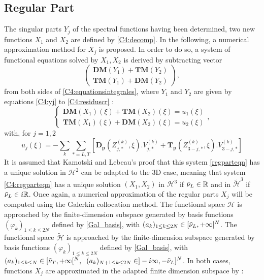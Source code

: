 \subsection{Regular Part}
\label{C4:regpart}
The singular parts $Y_j$ of the spectral functions having been determined, two new functions $X_1$ and $X_2$ are defined by \eqref{C4:decomp}. In the following, a numerical approximation method for $X_j$ is proposed. In order to do so, a system of functional equations solved by $X_1, X_2$ is derived by subtracting vector 
\begin{equation}
\begin{pmatrix}
\textbf{DM}(Y_1)+\textbf{TM}(Y_2) \\
\textbf{TM}(Y_1)+\textbf{DM}(Y_2)
\end{pmatrix},
\end{equation}
from both sides of \eqref{C4:equationsintegrales}, where $Y_1$ and $Y_2$ are given by equations \eqref{C4:yj} to \eqref{C4:residuscr} :
\begin{equation}
\left\{ 
\begin{matrix}
\mathbf{DM}(X_1)(\xi)+\textbf{TM}(X_2)(\xi)=u_1(\xi)\\
\textbf{TM}(X_1)(\xi)+\textbf{DM}(X_2)(\xi)=u_2(\xi)
\end{matrix}
\right.,
\label{C4:regparteqn}
\end{equation}
with, for $j=1,2$
\begin{equation}
u_j(\xi)=-\sum_k \sum_{*=L,T} \left[ \mathbf{D_p}(Z_{j,*}^{(k)},\xi).V_{j,*}^{(k)}+\mathbf{T_p}(Z_{3-j,*}^{(k)},\xi).V_{3-j,*}^{(k)}\right]
\label{C4:scndmembre}
\end{equation}
It is assumed that Kamotski and Lebeau's \cite{KamotskiLebeau} proof that this system \eqref{regparteqn} has a unique solution in $\mathcal{H}^2$ can be adapted to the 3D case, meaning that system \eqref{C4:regparteqn} has a unique solution $(X_1,X_2)$ in $\mathcal{H}^3$ if $\tilde{\nu}_L \in \mathbb{R}$ and in $\tilde{\mathcal{H}}^3$ if $\tilde{\nu}_L \in i\mathbb{R}$. Once again, a numerical approximation of the regular parts $X_j$ will be computed using the Galerkin collocation method. The functional space $\mathcal{H}$ is approached by the finite-dimension subspace generated by basis functions $(\varphi_k)_{1 \leq k \leq 2N}$ defined by \eqref{Gal_basis}, with $(a_k)_{1 \leq k \leq 2N} \in \lbrack \tilde{\nu}_L, + \infty \lbrack^N$. The functional space $\tilde{\mathcal{H}}$ is approached by the finite-dimension subspace generated by basis functions $(\varphi_k)_{1 \leq k \leq 2N}$ defined by \eqref{Gal_basis}, with $(a_k)_{1 \leq k \leq N} \in \lbrack \tilde{\nu}_T, + \infty \lbrack^N ,\; \; (a_k)_{N+1\leq k \leq 2N} \in \rbrack -i\infty, -\tilde{\nu}_L\rbrack^N$. In both cases, functions $X_j$ are approximated in the adapted finite dimension subspace by :
